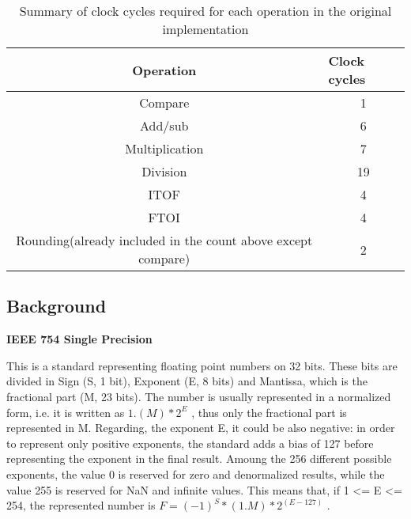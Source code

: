\begin{table}
\small
\begin{center}
\caption{Summary of clock cycles required for each operation in the original implementation}

\begin{tabular}{@{}|c|c|@{}}
\toprule
\textbf{Operation    }                                                & \multicolumn{1}{l|}{\textbf{Clock cycles}} \\ \midrule
Compare                                                      & 1                                 \\ \midrule
Add/sub                                                      & 6                                 \\ \midrule
Multiplication                                               & 7                                 \\ \midrule
Division                                                     & 19                                \\ \midrule
ITOF                                                         & 4                                 \\ \midrule
FTOI                                                         & 4                                 \\ \midrule
Rounding(already included in the count above except compare) & 2                                 \\ \bottomrule
\end{tabular}
  \label{tab:firstTiming}
\end{center}
\end{table}

\subsection{Background}
\textbf{IEEE 754 Single Precision}
\newline

This is a standard representing floating point numbers on 32 bits. These bits are divided in Sign (S, 1 bit), Exponent (E, 8 bits) and Mantissa, which is the fractional part (M, 23 bits). The number is usually represented in a normalized form, i.e. it is written as $1.(M) * {2}^E $ , thus only the fractional part is represented in M. Regarding, the exponent E, it could be also negative: in order to represent only positive exponents, the standard adds a bias of 127 before representing the exponent in the final result. Amoung the 256 different possible exponents, the value 0 is reserved for zero and denormalized results, while the value 255 is reserved for NaN and infinite values. This means that, if 1 <= E <= 254, the represented number is $ F=(-1)^S * (1.M) * {2}^{(E-127)}$ .
\newline

